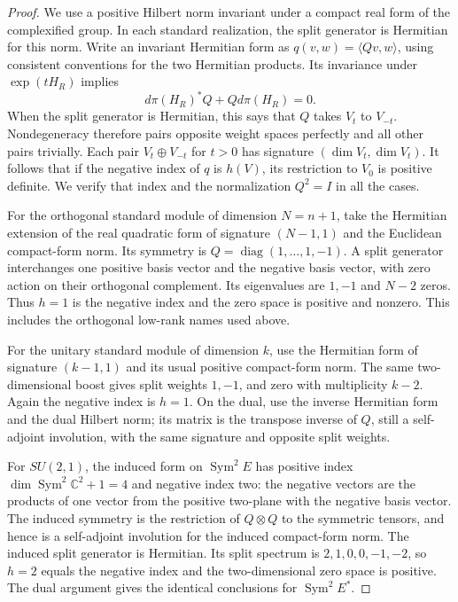 \begin{proof}
We use a positive Hilbert norm invariant under a compact real form
of the complexified group. In each standard realization, the
split generator is Hermitian for this norm. Write an invariant
Hermitian form as $q(v,w)=\langle Qv,w\rangle$, using
consistent conventions for the two Hermitian products. Its
invariance under $\exp(tH_R)$ implies
\[
 d\pi(H_R)^*Q+Qd\pi(H_R)=0.
\]
When the split generator is Hermitian, this says that $Q$ takes
$V_t$ to $V_{-t}$. Nondegeneracy therefore pairs opposite
weight spaces perfectly and all other pairs trivially. Each pair
$V_t\oplus V_{-t}$ for $t>0$ has signature
$(\dim V_t,\dim V_t)$. It follows that if the negative index
of $q$ is $h(V)$, its restriction to $V_0$ is positive
definite. We verify that index and the normalization $Q^2=I$
in all the cases.

For the orthogonal standard module of dimension $N=n+1$,
take the Hermitian extension of the real quadratic form of
signature $(N-1,1)$ and the Euclidean compact-form norm.
Its symmetry is $Q=\operatorname{diag}(1,\ldots,1,-1)$.
A split generator interchanges one positive basis vector and
the negative basis vector, with zero action on their orthogonal
complement. Its eigenvalues are $1,-1$ and $N-2$ zeros.
Thus $h=1$ is the negative index and the zero space is
positive and nonzero. This includes the orthogonal low-rank
names used above.

For the unitary standard module of dimension $k$, use the
Hermitian form of signature $(k-1,1)$ and its usual positive
compact-form norm. The same two-dimensional boost gives
split weights $1,-1$, and zero with multiplicity $k-2$.
Again the negative index is $h=1$. On the dual, use the
inverse Hermitian form and the dual Hilbert norm; its matrix
is the transpose inverse of $Q$, still a self-adjoint
involution, with the same signature and opposite split weights.

For $SU(2,1)$, the induced form on
$\operatorname{Sym}^2E$ has positive index
$\dim\operatorname{Sym}^2\mathbb C^2+1=4$ and negative
index two: the negative vectors are the products of one vector
from the positive two-plane with the negative basis vector.
The induced symmetry is the restriction of $Q\otimes Q$
to the symmetric tensors, and hence is a self-adjoint
involution for the induced compact-form norm. The induced
split generator is Hermitian. Its split spectrum is
$2,1,0,0,-1,-2$, so $h=2$ equals the negative index and
the two-dimensional zero space is positive. The dual argument
gives the identical conclusions for $\operatorname{Sym}^2E^*$.


\end{proof}
